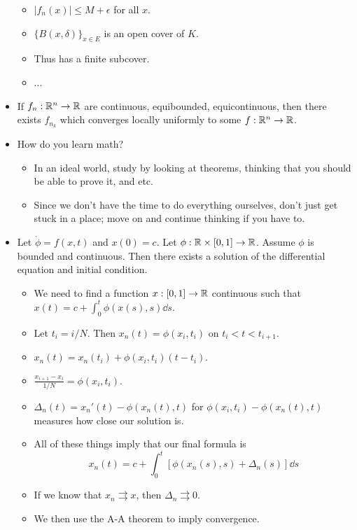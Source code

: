 \documentclass[../../notes.tex]{subfiles}
\begin{document}
\begin{itemize}
\begin{itemize}
        \item $|f_n(x)|\leq M+\epsilon$ for all $x$.
        \item $\{B(x,\delta)\}_{x\in E}$ is an open cover of $K$.
        \item Thus has a finite subcover.
        \item ...
    \end{itemize}
    \item If $f_n:\mathbb{R}^n\to\mathbb{R}$ are continuous, equibounded, equicontinuous, then there exists $f_{n_k}$ which converges locally uniformly to some $f:\mathbb{R}^n\to\mathbb{R}$.
    \item How do you learn math?
    \begin{itemize}
        \item In an ideal world, study by looking at theorems, thinking that you should be able to prove it, and etc.
        \item Since we don't have the time to do everything ourselves, don't just get stuck in a place; move on and continue thinking if you have to.
    \end{itemize}
    \item Let $\dot{\phi}=f(x,t)$ and $x(0)=c$. Let $\phi:\mathbb{R}\times[0,1]\to\mathbb{R}$. Assume $\phi$ is bounded and continuous. Then there exists a solution of the differential equation and initial condition.
    \begin{itemize}
        \item We need to find a function $x:[0,1]\to\mathbb{R}$ continuous such that $x(t)=c+\int_0^t\phi(x(s),s)\dd{s}$.
        \item Let $t_i=i/N$. Then $x_n(t)=\phi(x_i,t_i)$ on $t_i<t<t_{i+1}$.
        \item $x_n(t)=x_n(t_i)+\phi(x_i,t_i)(t-t_i)$.
        \item $\frac{x_{i+1}-x_i}{1/N}=\phi(x_i,t_i)$.
        \item $\Delta_n(t)=x_n'(t)-\phi(x_n(t),t)$ for $\phi(x_i,t_i)-\phi(x_n(t),t)$ measures how close our solution is.
        \item All of these things imply that our final formula is
        \begin{equation*}
            x_n(t) = c+\int_0^t[\phi(x_n(s),s)+\Delta_n(s)]\dd{s}
        \end{equation*}
        \item If we know that $x_n\rightrightarrows x$, then $\Delta_n\rightrightarrows 0$.
        \item We then use the A-A theorem to imply convergence.
    \end{itemize}

\end{itemize}
\end{document}
